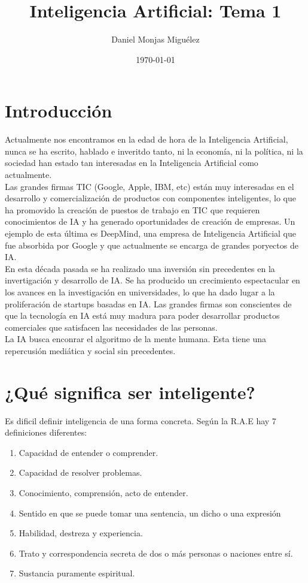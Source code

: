 \documentclass{article}
\title{Inteligencia Artificial: Tema 1}
\author{Daniel Monjas Miguélez}
\date{\today}
\begin{document}
\maketitle

\newpage

\tableofcontents

\newpage

\section{Introducción}
Actualmente nos encontramos en la edad de hora de la Inteligencia Artificial, nunca se ha escrito, hablado e inveritdo tanto, ni la economía, ni la política, ni la sociedad han estado tan interesadas en la Inteligencia Artificial como actualmente. \\

Las grandes firmas TIC (Google, Apple, IBM, etc) están muy interesadas en el desarrollo y comercialización de productos con componentes inteligentes, lo que ha promovido la creación de puestos de trabajo en TIC que requieren conocimientos de IA y ha generado oportunidades de creación de empresas. Un ejemplo de esta última es DeepMind, una empresa de Inteligencia Artificial que fue absorbida por Google y que actualmente se encarga de grandes poryectos de IA. \\

En esta década pasada se ha realizado una inversión sin precedentes en la invertigación y desarrollo de IA. Se ha producido un crecimiento espectacular en los avances en la investigación en universidades, lo que ha dado lugar a la proliferación de startups basadas en IA. Las grandes firmas son conscientes de que la tecnología en IA está muy madura para poder desarrollar productos comerciales que satisfacen las necesidades de las personas. \\

La IA busca enconrar el algoritmo de la mente humana. Esta tiene una repercusión mediática y social sin precedentes.

\section{¿Qué significa ser inteligente?}
Es dificil definir inteligencia de una forma concreta. Según la R.A.E hay 7 definiciones diferentes:

\begin{enumerate}
\item Capacidad de entender o comprender.
\item Capacidad de resolver problemas.
\item Conocimiento, comprensión, acto de entender.
\item Sentido en que se puede tomar una sentencia, un dicho o una expresión
\item Habilidad, destreza y experiencia.
\item Trato y correspondencia secreta de dos o más personas o naciones entre sí.
\item Sustancia puramente espiritual.
\end{enumerate}
\end{document}
